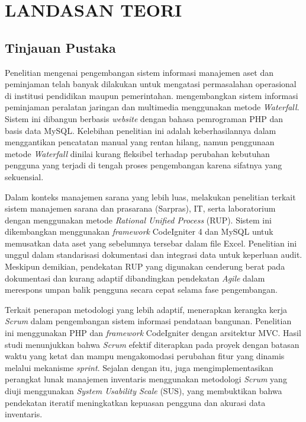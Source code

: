 \chapter{LANDASAN TEORI}
\sloppy

\section{Tinjauan Pustaka}
Penelitian mengenai pengembangan sistem informasi manajemen aset dan peminjaman telah banyak dilakukan untuk mengatasi permasalahan operasional di institusi pendidikan maupun pemerintahan. \textcite{Purwati2022} mengembangkan sistem informasi peminjaman peralatan jaringan dan multimedia menggunakan metode \textit{Waterfall}. Sistem ini dibangun berbasis \textit{website} dengan bahasa pemrograman PHP dan basis data MySQL. Kelebihan penelitian ini adalah keberhasilannya dalam menggantikan pencatatan manual yang rentan hilang, namun penggunaan metode \textit{Waterfall} dinilai kurang fleksibel terhadap perubahan kebutuhan pengguna yang terjadi di tengah proses pengembangan karena sifatnya yang sekuensial.

Dalam konteks manajemen sarana yang lebih luas, \textcite{PutriNabella2025} melakukan penelitian terkait sistem manajemen sarana dan prasarana (Sarpras), IT, serta laboratorium dengan menggunakan metode \textit{Rational Unified Process} (RUP). Sistem ini dikembangkan menggunakan \textit{framework} CodeIgniter 4 dan MySQL untuk memusatkan data aset yang sebelumnya tersebar dalam file Excel. Penelitian ini unggul dalam standarisasi dokumentasi dan integrasi data untuk keperluan audit. Meskipun demikian, pendekatan RUP yang digunakan cenderung berat pada dokumentasi dan kurang adaptif dibandingkan pendekatan \textit{Agile} dalam merespons umpan balik pengguna secara cepat selama fase pengembangan.

Terkait penerapan metodologi yang lebih adaptif, \textcite{Rifky2022} menerapkan kerangka kerja \textit{Scrum} dalam pengembangan sistem informasi pendataan bangunan. Penelitian ini menggunakan PHP dan \textit{framework} CodeIgniter dengan arsitektur MVC. Hasil studi menunjukkan bahwa \textit{Scrum} efektif diterapkan pada proyek dengan batasan waktu yang ketat dan mampu mengakomodasi perubahan fitur yang dinamis melalui mekanisme \textit{sprint}. Sejalan dengan itu, \textcite{Velasquez-Jimenez2025} juga mengimplementasikan perangkat lunak manajemen inventaris menggunakan metodologi \textit{Scrum} yang diuji menggunakan \textit{System Usability Scale} (SUS), yang membuktikan bahwa pendekatan iteratif meningkatkan kepuasan pengguna dan akurasi data inventaris.

